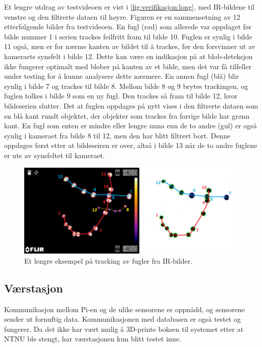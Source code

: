 Et lengre utdrag av testvideoen er vist i \autoref{fig:verifikasjon:long}, med IR-bildene til venstre og den filtrerte dataen til høyre. Figuren er en sammensetning av 12 etterfølgende bilder fra testvideoen.
En fugl (rød) som allerede var oppdaget før bilde nummer 1 i serien trackes feilfritt fram til bilde 10. 
Fuglen er synlig i bilde 11 også, men er for nærme kanten av bildet til å trackes, før den forsvinner ut av kameraets synsfelt i bilde 12.
Dette kan være en indikasjon på at blob-deteksjon ikke fungerer optimalt med blober på kanten av et bilde, men det var få tilfeller under testing for å kunne analysere dette nærmere.
En annen fugl (blå) blir synlig i bilde 7 og trackes til bilde 8. Mellom bilde 8 og 9 brytes trackingen, og fuglen tolkes i bilde 9 som en ny fugl. Den trackes så fram til bilde 12, hvor bildeserien slutter. Det at fuglen oppdages på nytt vises i den filtrerte dataen som en blå kant rundt objektet, der objekter som trackes fra forrige bilde har grønn kant.
En fugl som enten er mindre eller lengre unna enn de to andre (gul) er også synlig i kameraet fra bilde 8 til 12, men den har blitt filtrert bort. Denne oppdages først etter at bildeseiren er over, altså i bilde 13 når de to andre fuglene er ute av synsfeltet til kameraet. 

\begin{figure}[H]
    \centering
    \includegraphics[width=.8\textwidth]{verifikasjon-test/Tracking_ex/langt_eksempel.png}
    \caption{Et lengre eksempel på tracking av fugler fra IR-bilder.}
    \label{fig:verifikasjon:long}
\end{figure}



\subsection{Værstasjon}\label{sec:verifikasjon:telemetri}
Kommunikasjon mellom Pi-en og de ulike sensorene er oppnådd, og sensorene sender ut fornuftig data. Kommunikasjonen med databasen er også testet og fungerer.
Da det ikke har vært mulig å 3D-printe boksen til systemet etter at NTNU ble stengt, har værstasjonen kun blitt testet inne. 

